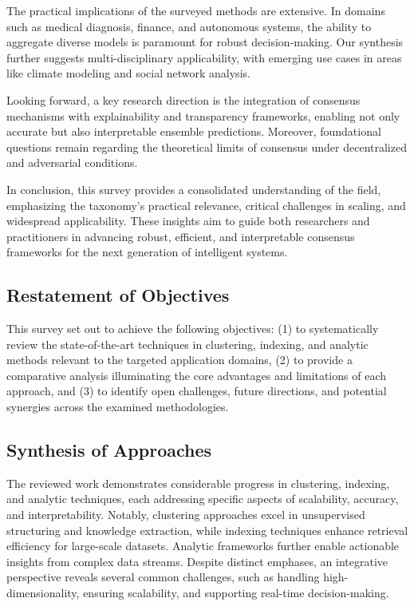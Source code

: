 \documentclass[sigconf]{acmart}
\begin{document}
The practical implications of the surveyed methods are extensive. In domains such as medical diagnosis, finance, and autonomous systems, the ability to aggregate diverse models is paramount for robust decision-making. Our synthesis further suggests multi-disciplinary applicability, with emerging use cases in areas like climate modeling and social network analysis.

Looking forward, a key research direction is the integration of consensus mechanisms with explainability and transparency frameworks, enabling not only accurate but also interpretable ensemble predictions. Moreover, foundational questions remain regarding the theoretical limits of consensus under decentralized and adversarial conditions.

In conclusion, this survey provides a consolidated understanding of the field, emphasizing the taxonomy’s practical relevance, critical challenges in scaling, and widespread applicability. These insights aim to guide both researchers and practitioners in advancing robust, efficient, and interpretable consensus frameworks for the next generation of intelligent systems.

\subsection{Restatement of Objectives}
This survey set out to achieve the following objectives: (1) to systematically review the state-of-the-art techniques in clustering, indexing, and analytic methods relevant to the targeted application domains, (2) to provide a comparative analysis illuminating the core advantages and limitations of each approach, and (3) to identify open challenges, future directions, and potential synergies across the examined methodologies.

\subsection{Synthesis of Approaches}
The reviewed work demonstrates considerable progress in clustering, indexing, and analytic techniques, each addressing specific aspects of scalability, accuracy, and interpretability. Notably, clustering approaches excel in unsupervised structuring and knowledge extraction, while indexing techniques enhance retrieval efficiency for large-scale datasets. Analytic frameworks further enable actionable insights from complex data streams. Despite distinct emphases, an integrative perspective reveals several common challenges, such as handling high-dimensionality, ensuring scalability, and supporting real-time decision-making.
\end{document}
